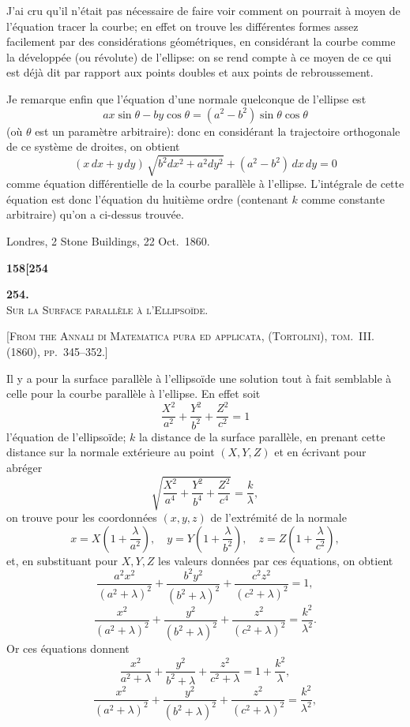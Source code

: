 \documentclass[11pt]{article}
\begin{document}
J'ai cru qu'il n'était pas nécessaire de faire voir comment on pourrait à moyen de l'équation tracer la courbe; en effet on trouve les différentes formes assez facilement par des considérations géométriques, en considérant la courbe comme la développée (ou révolute) de l'ellipse: on se rend compte à ce moyen de ce qui est déjà dit par rapport aux points doubles et aux points de rebroussement.

Je remarque enfin que l'équation d'une normale quelconque de l'ellipse est
\[
ax\sin\theta - by\cos\theta = (a^2 - b^2)\sin\theta\cos\theta
\]
(où $\theta$ est un paramètre arbitraire): donc en considérant la trajectoire orthogonale de ce système de droites, on obtient
\[
(x\,dx + y\,dy)\,\sqrt{b^2dx^2 + a^2dy^2} + (a^2 - b^2)\,dx\,dy = 0
\]
comme équation différentielle de la courbe parallèle à l'ellipse. L'intégrale de cette équation est donc l'équation du huitième ordre (contenant $k$ comme constante arbitraire) qu'on a ci-dessus trouvée.

\medskip

\hfill Londres, 2 Stone Buildings, 22 Oct.\ 1860.

\newpage


\noindent\textbf{158}\hfill\hfill\textbf{[254}

\medskip

\begin{center}
\textbf{254.}\\[0.6em]
{\Large\textsc{Sur la Surface parallèle à l'Ellipsoïde.}}
\end{center}

\medskip

\textsc{[From the Annali di Matematica pura ed applicata, (Tortolini), tom.~III. (1860), pp.~345--352.]}

\medskip

Il y a pour la surface parallèle à l'ellipsoïde une solution tout à fait semblable à celle pour la courbe parallèle à l'ellipse. En effet soit
\[
\frac{X^2}{a^2} + \frac{Y^2}{b^2} + \frac{Z^2}{c^2} = 1
\]
l'équation de l'ellipsoïde; $k$ la distance de la surface parallèle, en prenant cette distance sur la normale extérieure au point $(X, Y, Z)$ et en écrivant pour abréger
\[
\sqrt{\frac{X^2}{a^4} + \frac{Y^2}{b^4} + \frac{Z^2}{c^4}} = \frac{k}{\lambda},
\]
on trouve pour les coordonnées $(x, y, z)$ de l'extrémité de la normale
\[
x = X\left(1 + \frac{\lambda}{a^2}\right),\quad y = Y\left(1 + \frac{\lambda}{b^2}\right),\quad z = Z\left(1 + \frac{\lambda}{c^2}\right),
\]
et, en substituant pour $X, Y, Z$ les valeurs données par ces équations, on obtient
\[
\frac{a^2x^2}{(a^2 + \lambda)^2} + \frac{b^2y^2}{(b^2 + \lambda)^2} + \frac{c^2z^2}{(c^2 + \lambda)^2} = 1,
\]
\[
\frac{x^2}{(a^2 + \lambda)^2} + \frac{y^2}{(b^2 + \lambda)^2} + \frac{z^2}{(c^2 + \lambda)^2} = \frac{k^2}{\lambda^2}.
\]
Or ces équations donnent
\[
\frac{x^2}{a^2 + \lambda} + \frac{y^2}{b^2 + \lambda} + \frac{z^2}{c^2 + \lambda} = 1 + \frac{k^2}{\lambda},
\]
\[
\frac{x^2}{(a^2 + \lambda)^2} + \frac{y^2}{(b^2 + \lambda)^2} + \frac{z^2}{(c^2 + \lambda)^2} = \frac{k^2}{\lambda^2},
\]
\end{document}
